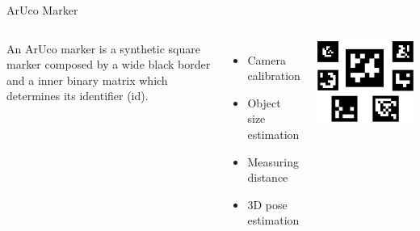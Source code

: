 \documentclass[12pt,letterpaper]{beamer}
\begin{document}
\begin{frame}{ArUco Marker}
    \begin{columns}
        An ArUco marker is a synthetic square marker composed by a wide black border and a inner binary matrix which determines its identifier (id). 
        {\scriptsize
            \begin{itemize}
                \item Camera calibration
                \item Object size estimation
                \item Measuring distance
                \item 3D pose estimation
            \end{itemize}
        }
        \includegraphics[width=0.8\linewidth]{aruco_markers}
    \end{columns}
\end{frame}
\end{document}
